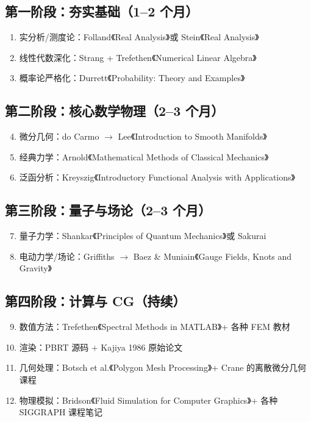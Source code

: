 \subsection{第一阶段：夯实基础（1--2 个月）}
\begin{enumerate}
  \item 实分析/测度论：Folland《Real Analysis》或 Stein《Real Analysis》
  \item 线性代数深化：Strang + Trefethen《Numerical Linear Algebra》
  \item 概率论严格化：Durrett《Probability: Theory and Examples》
\end{enumerate}

\subsection{第二阶段：核心数学物理（2--3 个月）}
\begin{enumerate}
  \setcounter{enumi}{3}
  \item 微分几何：do Carmo $\to$ Lee《Introduction to Smooth Manifolds》
  \item 经典力学：Arnold《Mathematical Methods of Classical Mechanics》
  \item 泛函分析：Kreyszig《Introductory Functional Analysis with Applications》
\end{enumerate}

\subsection{第三阶段：量子与场论（2--3 个月）}
\begin{enumerate}
  \setcounter{enumi}{6}
  \item 量子力学：Shankar《Principles of Quantum Mechanics》或 Sakurai
  \item 电动力学/场论：Griffiths $\to$ Baez \& Muniain《Gauge Fields, Knots and Gravity》
\end{enumerate}

\subsection{第四阶段：计算与 CG（持续）}
\begin{enumerate}
  \setcounter{enumi}{8}
  \item 数值方法：Trefethen《Spectral Methods in MATLAB》+ 各种 FEM 教材
  \item 渲染：PBRT 源码 + Kajiya 1986 原始论文
  \item 几何处理：Botsch et al.《Polygon Mesh Processing》+ Crane 的离散微分几何课程
  \item 物理模拟：Bridson《Fluid Simulation for Computer Graphics》+ 各种 SIGGRAPH 课程笔记
\end{enumerate}

